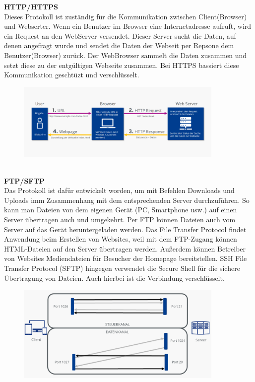 \documentclass[a4paper,12pt]{article}
\begin{document}
\textbf{HTTP/HTTPS}\\
Dieses Protokoll ist zuständig für die Kommunikation zwischen Client(Browser) und Webserter. Wenn ein Benutzer im Browser eine Internetadresse aufruft, wird ein Request an den WebServer versendet. Dieser Server sucht die Daten, auf denen angefragt wurde und sendet die Daten der Webseit per Repsone dem Benutzer(Browser) zurück. Der WebBrowser sammelt die Daten zusammen und setzt diese zu der entgültigen Webseite zusammen. Bei HTTPS bassiert diese Kommunikation geschtüzt und verschlüsselt.
\begin{figure}[h]
    \centering
    \includegraphics[width=10cm]{http.png}
\end{figure}
\\
\textbf{FTP/SFTP}\\
Das Protokoll ist dafür entwickelt worden, um mit Befehlen Downloads und Uploads imm Zusammenhang mit dem entsprechenden Server durchzuführen. So kann man Dateien von dem eigenen Gerät (PC, Smartphone usw.) auf einen Server übertragen auch und umgekehrt. Per FTP können Dateien auch vom Server auf das Gerät heruntergeladen werden.
Das File Transfer Protocol findet Anwendung beim Erstellen von Websites, weil mit dem FTP-Zugang können HTML-Dateien auf den Server übertragen werden. Außerdem können Betreiber von Websites Mediendateien für Besucher der Homepage bereitstellen.
SSH File Transfer Protocol (SFTP) hingegen verwendet die Secure Shell für die sichere Übertragung von Dateien. Auch hierbei ist die Verbindung verschlüsselt.
\begin{figure}[h]
    \centering
    \includegraphics[width=10cm]{ftp.png}
\end{figure}
\end{document}
